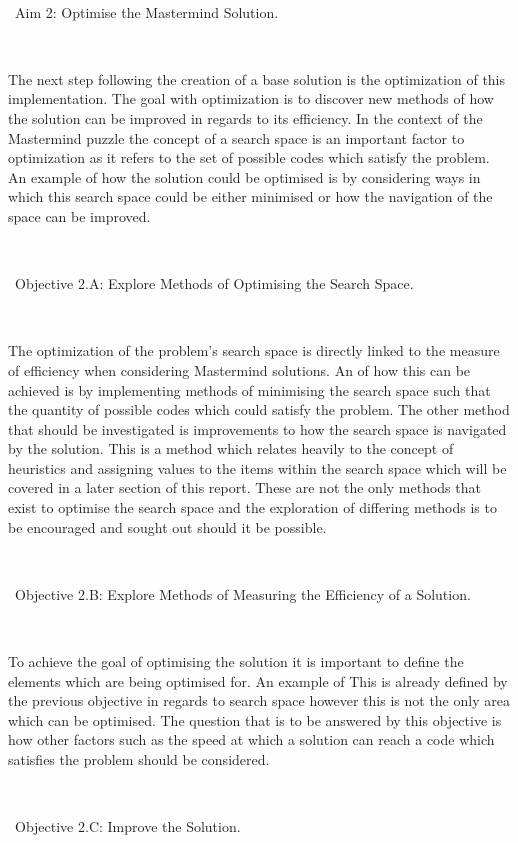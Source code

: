 \documentclass[11pt]{article}  %
\theoremstyle{definition}
\theoremstyle{remark}
\begin{document}
\

\textbullet\ Aim 2: Optimise the Mastermind Solution.

\

The next step following the creation of a base solution is the optimization of this implementation. The goal with optimization is to discover
new methods of how the solution can be improved in regards to its efficiency. In the context of the Mastermind puzzle the concept of a
search space is an important factor to optimization as it refers to the set of possible codes which satisfy the problem. An example of how
the solution could be optimised is by considering ways in which this search space could be either minimised or how the navigation of the
space can be improved.


\

\textbullet\ Objective 2.A: Explore Methods of Optimising the Search Space.

\

The optimization of the problem's search space is directly linked to the measure of efficiency when considering Mastermind solutions.
An of how this can be achieved is by implementing methods of minimising the search space such that the quantity of possible codes
which could satisfy the problem. The other method that should be investigated is improvements to how the search space
is navigated by the solution. This is a method which relates heavily to the concept of heuristics and assigning values to the items within
the search space which will be covered in a later section of this report. These are not the only methods that exist to optimise the
search space and the exploration of differing methods is to be encouraged and sought out should it be possible.

\

\textbullet\ Objective 2.B: Explore Methods of Measuring the Efficiency of a Solution.

\

To achieve the goal of optimising the solution it is important to define the elements which are being optimised for. An example of
This is already defined by the previous objective in regards to search space however this is not the only area which can be optimised.
The question that is to be answered by this objective is how other factors such as the speed at which a solution can reach a code
which satisfies the problem should be considered.


\

\textbullet\ Objective 2.C: Improve the Solution.
\end{document}

